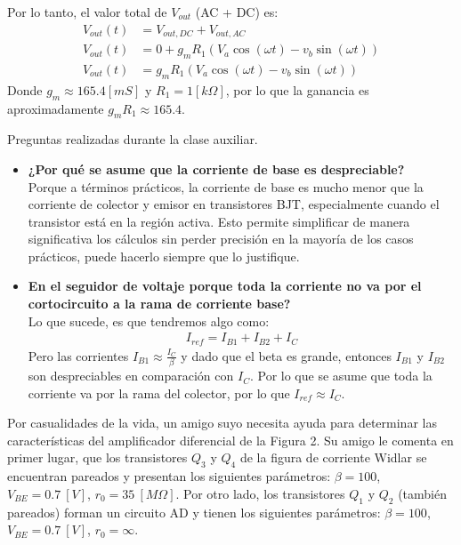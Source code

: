 \documentclass[
  11pt,
  letterpaper,
   addpoints,
   answers
  ]{exam}
\begin{document}
\begin{questions}
\begin{parts}
\begin{solution}
Por lo tanto, el valor total de $V_{out}$ (AC + DC) es:
\begin{align}
  V_{out}(t) &= V_{out,DC} + V_{out,AC}\\
  V_{out}(t) &= 0 + g_{m} R_{1} (V_a \cos(\omega t) - v_b \sin(\omega t))\\
  V_{out}(t) &= g_{m} R_{1} (V_a \cos(\omega t) - v_b \sin(\omega t))
\end{align}
Donde $g_m \approx 165.4[mS]$ y $R_1 = 1[k\Omega]$, por lo que la ganancia es aproximadamente $g_m R_1 \approx 165.4$.
\end{solution}
\begin{solution}
  Preguntas realizadas durante la clase auxiliar.
  \begin{itemize}
    \item \textbf{¿Por qué se asume que la corriente de base es despreciable?}\\
    Porque a términos prácticos, la corriente de base es mucho menor que la corriente de colector y emisor en transistores BJT, especialmente cuando el transistor está en la región activa. Esto permite simplificar de manera significativa los cálculos sin perder precisión en la mayoría de los casos prácticos, puede hacerlo siempre que lo justifique.
    \item \textbf{En el seguidor de voltaje porque toda la corriente no va por el cortocircuito a la rama de corriente base?}\\
    Lo que sucede, es que tendremos algo como:
    \begin{align}
      I_{ref} = I_{B1} + I_{B2} + I_{C}
    \end{align}
    Pero las corrientes $I_{B1} \approx \frac{I_{C}}{\beta}$ y dado que el beta es grande, entonces $I_{B1}$ y $I_{B2}$ son despreciables en comparación con $I_{C}$. Por lo que se asume que toda la corriente va por la rama del colector, por lo que $I_{ref} \approx I_{C}$.  
  \end{itemize}
\end{solution}
\end{parts}
\question Por casualidades de la vida, un amigo suyo necesita ayuda para determinar las características del amplificador diferencial de la Figura 2. Su amigo le comenta en primer lugar, que los transistores $Q_3$ y $Q_4$ de la figura de corriente Widlar se encuentran pareados y presentan los siguientes parámetros: $\beta = 100$, $V_{BE} = 0.7~[V]$, $r_0 = 35~[M\Omega]$. Por otro lado, los transistores $Q_1$ y $Q_2$ (también pareados) forman un circuito AD y tienen los siguientes parámetros: $\beta = 100$, $V_{BE} = 0.7~[V]$, $r_0 = \infty$.


\end{questions}
\end{document}
